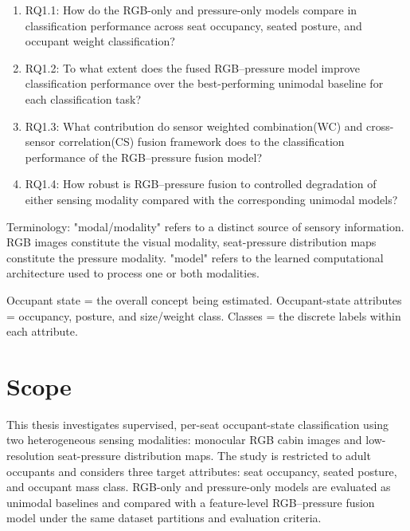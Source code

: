 \begin{enumerate}
    \item RQ1.1: How do the RGB-only and pressure-only models compare in classification performance across seat occupancy, 
    seated posture, and occupant weight classification?
    \item RQ1.2: To what extent does the fused RGB–pressure model improve classification performance over the best-performing
         unimodal baseline for each classification task?
    \item RQ1.3: What contribution do sensor weighted combination(WC) and cross-sensor correlation(CS) fusion framework does to the 
        classification performance of the RGB–pressure fusion model?
    \item RQ1.4: How robust is RGB–pressure fusion to controlled degradation of either sensing modality compared with the
         corresponding unimodal models?
\end{enumerate}

Terminology: 
"modal/modality" refers to a distinct source of sensory information. RGB images constitute the visual modality, 
    seat-pressure distribution maps constitute the pressure modality. 
"model" refers to the learned computational architecture used to process one or both modalities.

Occupant state = the overall concept being estimated.
Occupant-state attributes = occupancy, posture, and size/weight class.
Classes = the discrete labels within each attribute.
\section{Scope}
\label{sec:scope}

This thesis investigates supervised, per-seat occupant-state classification using two heterogeneous sensing modalities: 
monocular RGB cabin images and low-resolution seat-pressure distribution maps. The study is restricted to adult occupants 
and considers three target attributes: seat occupancy, seated posture, and occupant mass class. RGB-only and pressure-only 
models are evaluated as unimodal baselines and compared with a feature-level RGB--pressure fusion model under the same dataset 
partitions and evaluation criteria.

